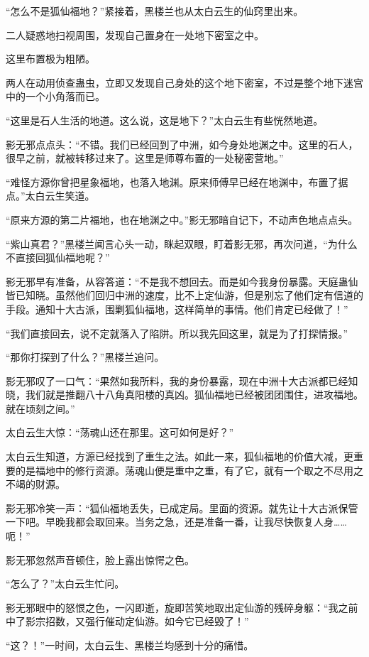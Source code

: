 \begin{this_body}
“怎么不是狐仙福地？”紧接着，黑楼兰也从太白云生的仙窍里出来。

二人疑惑地扫视周围，发现自己置身在一处地下密室之中。

这里布置极为粗陋。

两人在动用侦查蛊虫，立即又发现自己身处的这个地下密室，不过是整个地下迷宫中的一个小角落而已。

“这里是石人生活的地道。这么说，这是地下？”太白云生有些恍然地道。

影无邪点点头：“不错。我们已经回到了中洲，如今身处地渊之中。这里的石人，很早之前，就被转移过来了。这里是师尊布置的一处秘密营地。”

“难怪方源你曾把星象福地，也落入地渊。原来师傅早已经在地渊中，布置了据点。”太白云生笑道。

“原来方源的第二片福地，也在地渊之中。”影无邪暗自记下，不动声色地点点头。

“紫山真君？”黑楼兰闻言心头一动，眯起双眼，盯着影无邪，再次问道，“为什么不直接回狐仙福地呢？”

影无邪早有准备，从容答道：“不是我不想回去。而是如今我身份暴露。天庭蛊仙皆已知晓。虽然他们回归中洲的速度，比不上定仙游，但是别忘了他们定有信道的手段。通知十大古派，围剿狐仙福地，这样简单的事情。他们肯定已经做了！”

“我们直接回去，说不定就落入了陷阱。所以我先回这里，就是为了打探情报。”

“那你打探到了什么？”黑楼兰追问。

影无邪叹了一口气：“果然如我所料，我的身份暴露，现在中洲十大古派都已经知晓，我们就是推翻八十八角真阳楼的真凶。狐仙福地已经被团团围住，进攻福地。就在顷刻之间。”

太白云生大惊：“荡魂山还在那里。这可如何是好？”

太白云生知道，方源已经找到了重生之法。如此一来，狐仙福地的价值大减，更重要的是福地中的修行资源。荡魂山便是重中之重，有了它，就有一个取之不尽用之不竭的财源。

影无邪冷笑一声：“狐仙福地丢失，已成定局。里面的资源。就先让十大古派保管一下吧。早晚我都会取回来。当务之急，还是准备一番，让我尽快恢复人身……呃！”

影无邪忽然声音顿住，脸上露出惊愕之色。

“怎么了？”太白云生忙问。

影无邪眼中的怒恨之色，一闪即逝，旋即苦笑地取出定仙游的残碎身躯：“我之前中了影宗招数，又强行催动定仙游。如今它已经毁了！”

“这？！”一时间，太白云生、黑楼兰均感到十分的痛惜。


\end{this_body}
